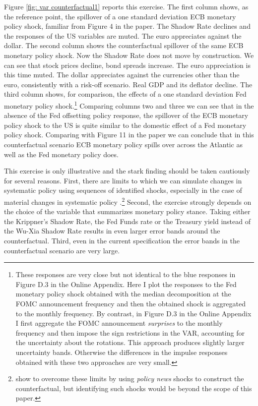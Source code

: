 Figure \ref{fig: var counterfactual1} reports this exercise.
The first column shows, as the reference point, the spillover of a one standard deviation ECB monetary policy shock, familiar from Figure 4 in the paper.
The Shadow Rate declines and the responses of the US variables are muted.
The euro appreciates against the dollar.
The second column shows the counterfactual spillover of the same ECB monetary policy shock.
Now the Shadow Rate does not move by construction.
We can see that stock prices decline, bond spreads increase. The euro appreciation
is this time muted. The dollar appreciates against the currencies other than the euro,
consistently with a risk-off scenario. Real GDP and its deflator decline.
The third column shows, for comparison, the effects of a one standard deviation Fed monetary policy shock.\footnote{These responses are very close but not identical to the blue responses in Figure D.3 in the Online Appendix.
Here I plot the responses to the Fed monetary policy shock obtained with the median decomposition at the FOMC announcement frequency and then the obtained shock is aggregated to the monthly frequency.
By contrast, in Figure D.3 in the Online Appendix I first aggregate the FOMC announcement \emph{surprises}
to the monthly frequency and then impose the sign restrictions in the VAR, accounting for the uncertainty about the rotations.
This approach produces slightly larger uncertainty bands. Otherwise the differences in the impulse responses obtained with these two approaches are very small.}
Comparing columns two and three we can see that in the absence of the Fed offsetting policy response,
the spillover of the ECB monetary policy shock to the US is quite similar to the domestic effect of a Fed monetary policy shock. Comparing with Figure 11 in the paper we can conclude that in this counterfactual scenario ECB monetary policy spills over across the Atlantic as well as the Fed monetary policy does.

This exercise is only illustrative and the stark finding should be taken cautiously for several reasons.
First, there are limits to which we can simulate changes in systematic policy using sequences of identified shocks, especially in the case of material changes in systematic policy \citep{Leeper_Zha_2003}.\footnote{\cite{McKay_Wolf_2022} show to overcome these limits by using \emph{policy news} shocks to construct the counterfactual, but identifying such shocks would be beyond the scope of this paper.} Second, the exercise strongly depends on the choice of the variable that summarizes monetary policy stance. 
Taking either the Krippner's Shadow Rate, the Fed Funds rate or the Treasury yield instead of the Wu-Xia Shadow Rate results in even larger error bands around the counterfactual. Third, even in the current specification the error bands in the counterfactual scenario are very large.





